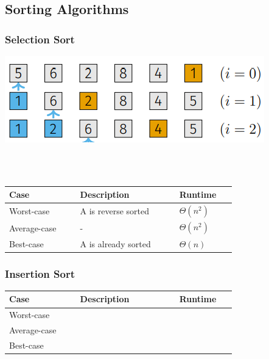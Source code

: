 \subsection{Sorting Algorithms}
    \subsubsection{Selection Sort}
        \begin{minipage}{0.59\linewidth}
            \includegraphics[width = \linewidth]{src/6_algorithms/images/selection_sort.png}
        \end{minipage}
        \begin{minipage}{0.39\linewidth}
            \\
            \\
        \end{minipage}

        
        
        \begin{tabular*}{\linewidth}{| p{0.25\linewidth} | p{0.35\linewidth} | p{0.2\linewidth} |}
            \hline
            Case & Description & Runtime\\
            \hline \hline
            Worst-case & A is reverse sorted & $\Theta(n^2)$ \\
            \hline
            Average-case & - & $\Theta(n^2)$ \\
            \hline
            Best-case & A is already sorted & $\Theta(n)$ \\
            \hline
        \end{tabular*}
        
    \subsubsection{Insertion Sort}
        \begin{tabular*}{\linewidth}{| p{0.25\linewidth} | p{0.35\linewidth} | p{0.2\linewidth} |}
            \hline
            Case & Description & Runtime\\
            \hline \hline
            Worst-case &  &  \\
            \hline
            Average-case &  &  \\
            \hline
            Best-case &  &  \\
            \hline
        \end{tabular*}

